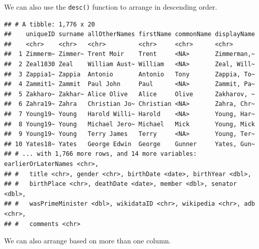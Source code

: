 \documentclass[
]{book}
\newenvironment{Shaded}{\begin{snugshade}}{\end{snugshade}}
\newcommand{\KeywordTok}[1]{\textcolor[rgb]{0.13,0.29,0.53}{\textbf{#1}}}
\newcommand{\NormalTok}[1]{#1}
\newcommand{\OperatorTok}[1]{\textcolor[rgb]{0.81,0.36,0.00}{\textbf{#1}}}
\newcommand{\StringTok}[1]{\textcolor[rgb]{0.31,0.60,0.02}{#1}}
\begin{document}
We can also use the \texttt{desc()} function to arrange in descending order.

\begin{Shaded}
\end{Shaded}

\begin{verbatim}
## # A tibble: 1,776 x 20
##    uniqueID surname allOtherNames firstName commonName displayName
##    <chr>    <chr>   <chr>         <chr>     <chr>      <chr>      
##  1 Zimmerm~ Zimmer~ Trent Moir    Trent     <NA>       Zimmerman,~
##  2 Zeal1830 Zeal    William Aust~ William   <NA>       Zeal, Will~
##  3 Zappia1~ Zappia  Antonio       Antonio   Tony       Zappia, To~
##  4 Zammit1~ Zammit  Paul John     Paul      <NA>       Zammit, Pa~
##  5 Zakharo~ Zakhar~ Alice Olive   Alice     Olive      Zakharov, ~
##  6 Zahra19~ Zahra   Christian Jo~ Christian <NA>       Zahra, Chr~
##  7 Young19~ Young   Harold Willi~ Harold    <NA>       Young, Har~
##  8 Young19~ Young   Michael Jero~ Michael   Mick       Young, Mick
##  9 Young19~ Young   Terry James   Terry     <NA>       Young, Ter~
## 10 Yates18~ Yates   George Edwin  George    Gunner     Yates, Gun~
## # ... with 1,766 more rows, and 14 more variables: earlierOrLaterNames <chr>,
## #   title <chr>, gender <chr>, birthDate <date>, birthYear <dbl>,
## #   birthPlace <chr>, deathDate <date>, member <dbl>, senator <dbl>,
## #   wasPrimeMinister <dbl>, wikidataID <chr>, wikipedia <chr>, adb <chr>,
## #   comments <chr>
\end{verbatim}

We can also arrange based on more than one column.

\begin{Shaded}
\end{Shaded}
\end{document}
